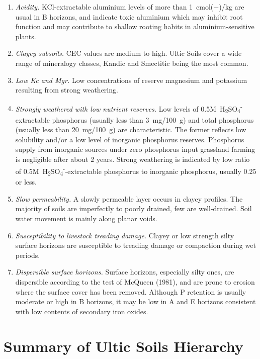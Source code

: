 \documentclass[
  letterpaper,
  DIV=11,
  numbers=noendperiod]{scrreprt}
\providecommand{\tightlist}{%
  \setlength{\itemsep}{0pt}\setlength{\parskip}{0pt}}\usepackage{longtable,booktabs,array}
\begin{document}
\begin{enumerate}
\def\labelenumi{\arabic{enumi}.}
\tightlist
\item
  \emph{Acidity.} KCl-extractable aluminium levels of more than
  1~cmol(+)/kg are usual in B horizons, and indicate toxic aluminium
  which may inhibit root function and may contribute to shallow rooting
  habits in aluminium-sensitive plants.
\item
  \emph{Clayey subsoils.} CEC values are medium to high. Ultic Soils
  cover a wide range of mineralogy classes, Kandic and Smectitic being
  the most common.
\item
  \emph{Low Kc and Mgr.} Low concentrations of reserve magnesium and
  potassium resulting from strong weathering.
\item
  \emph{Strongly weathered with low nutrient reserves.} Low levels of
  0.5M~H\textsubscript{2}SO\textsubscript{4}\textsuperscript{-}
  extractable phosphorus (usually less than 3~mg/100~g) and total
  phosphorus (usually less than 20~mg/100~g) are characteristic. The
  former reflects low solubility and/or a low level of inorganic
  phosphorus reserves. Phosphorus supply from inorganic sources under
  zero phosphorus input grassland farming is negligible after about 2
  years. Strong weathering is indicated by low ratio of
  0.5M~H\textsubscript{2}SO\textsubscript{4}\textsuperscript{-}-extractable
  phosphorus to inorganic phosphorus, usually 0.25 or less.
\item
  \emph{Slow permeability.} A slowly permeable layer occurs in clayey
  profiles. The majority of soils are imperfectly to poorly drained, few
  are well-drained. Soil water movement is mainly along planar voids.
\item
  \emph{Susceptibility to livestock treading damage.} Clayey or low
  strength silty surface horizons are susceptible to treading damage or
  compaction during wet periods.
\item
  \emph{Dispersible surface horizons.} Surface horizons, especially
  silty ones, are dispersible according to the test of McQueen (1981),
  and are prone to erosion where the surface cover has been removed.
  Although P retention is usually moderate or high in B horizons, it may
  be low in A and E horizons consistent with low contents of secondary
  iron oxides.
\end{enumerate}

\hypertarget{sec-sum-U}{%
\section{Summary of Ultic Soils Hierarchy}\label{sec-sum-U}}
\end{document}
